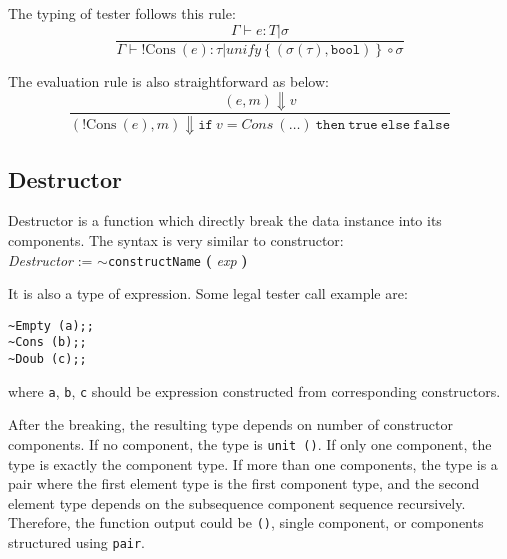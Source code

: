 \documentclass[a4paper,12pt]{article}
\begin{document}
		The typing of tester follows this rule:
		\begin{equation*}
			\frac{
				\Gamma \vdash e: T | \sigma
			}{
				\Gamma \vdash \mathtt{!}\mathrm{Cons\ } (e): \tau | \mathit{unify}\left\{(\sigma(\tau), \texttt{bool})\right\} \circ \sigma
			}
		\end{equation*}
		
		The evaluation rule is also straightforward as below:
		\begin{equation*}
			\frac{
				(e, m) \Downarrow v
			}{
				(\mathtt{!}\mathrm{Cons\ }(e), m) \Downarrow \mathtt{if\ } v=\mathit{Cons\ } (\dots) \ \mathtt{then\ } \mathtt{true\ } \mathtt{else\ } \mathtt{false}
			}
		\end{equation*}
	
	\subsection{Destructor}
		Destructor is a function which directly break the data instance into its components. The syntax is very similar to constructor:\\
		\textit{Destructor} := $\sim$\texttt{constructName} \textbf{(} \textit{exp} \textbf{)}
		
		It is also a type of expression. Some legal tester call example are:
		\begin{lstlisting}
~Empty (a);;
~Cons (b);;
~Doub (c);;
		\end{lstlisting}
		where \texttt{a}, \texttt{b}, \texttt{c} should be expression constructed from corresponding constructors.
		
		After the breaking, the resulting type depends on number of constructor components. If no component, the type is \texttt{unit ()}. If only one component, the type is exactly the component type. If more than one components, the type is a pair where the first element type is the first component type, and the second element type depends on the subsequence component sequence recursively. Therefore, the function output could be \texttt{()}, single component, or components structured using \texttt{pair}.
		
\end{document}
